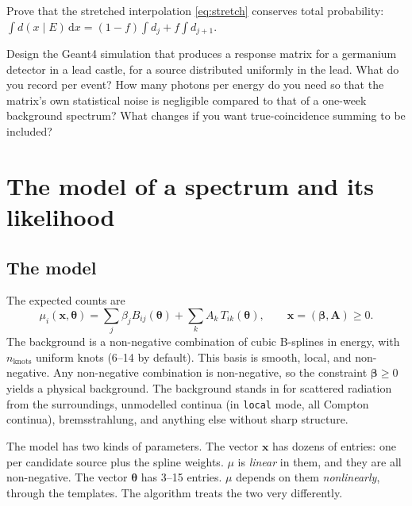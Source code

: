 \documentclass[11pt]{article}
\newcounter{exercise}[section]
\newcommand{\dd}{\mathrm{d}}
\newcommand{\vth}{\bm{\theta}}
\newcommand{\vx}{\bm{x}}
\newcommand{\code}[1]{\texttt{#1}}
\begin{document}
\begin{exercise}[A]
Prove that the stretched interpolation \cref{eq:stretch} conserves total probability: $\int d(x\mid E)\,\dd x = (1-f)\int d_j + f\int d_{j+1}$.
\end{exercise}

\begin{exercise}[R]
Design the Geant4 simulation that produces a response matrix for a germanium detector in a lead castle, for a source distributed uniformly in the lead. What do you record per event? How many photons per energy do you need so that the matrix's own statistical noise is negligible compared to that of a one-week background spectrum? What changes if you want true-coincidence summing to be included?
\end{exercise}

\section{The model of a spectrum and its likelihood}\label{sec:likelihood}
\subsection{The model}
The expected counts are
\begin{equation}
\mu_i(\vx,\vth) = \sum_{j} \beta_j B_{ij}(\vth) + \sum_k A_k\,T_{ik}(\vth),\qquad \vx = (\bm\beta,\bm A)\ge 0. \label{eq:model}
\end{equation}
The background is a non-negative combination of cubic B-splines in energy, with $n_\text{knots}$ uniform knots (6--14 by default). This basis is smooth, local, and non-negative. Any non-negative combination is non-negative, so the constraint $\bm\beta\ge0$ yields a physical background. The background stands in for scattered radiation from the surroundings, unmodelled continua (in \code{local} mode, all Compton continua), bremsstrahlung, and anything else without sharp structure.

The model has two kinds of parameters. The vector $\vx$ has dozens of entries: one per candidate source plus the spline weights. $\mu$ is \emph{linear} in them, and they are all non-negative. The vector $\vth$ has 3--15 entries. $\mu$ depends on them \emph{nonlinearly}, through the templates. The algorithm treats the two very differently.
\end{document}
